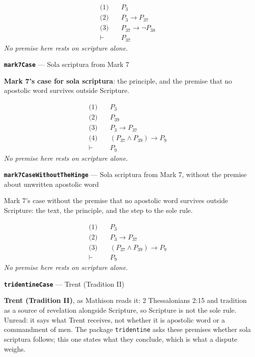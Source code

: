 \documentclass[11pt]{article}
\begin{document}
\begin{align*}
  \text{(1)} \quad & P_{3} \\
  \text{(2)} \quad & P_{3} \rightarrow P_{37} \\
  \text{(3)} \quad & P_{37} \rightarrow \lnot P_{38} \\
  \vdash \quad & P_{37}
\end{align*}
\emph{No premise here rests on scripture alone.}
\par\medskip\noindent\textbf{\texttt{mark7\allowbreak{}Case}} --- Sola scriptura from Mark 7\par\nobreak\noindent
\textbf{Mark 7's case for sola scriptura}: the principle, and the premise that no apostolic word survives outside Scripture.

\begin{align*}
  \text{(1)} \quad & P_{3} \\
  \text{(2)} \quad & P_{39} \\
  \text{(3)} \quad & P_{3} \rightarrow P_{37} \\
  \text{(4)} \quad & (P_{37} \land P_{39}) \rightarrow P_{9} \\
  \vdash \quad & P_{9}
\end{align*}
\emph{No premise here rests on scripture alone.}
\par\medskip\noindent\textbf{\texttt{mark7\allowbreak{}Case\allowbreak{}Without\allowbreak{}The\allowbreak{}Hinge}} --- Sola scriptura from Mark 7, without the premise about unwritten apostolic word\par\nobreak\noindent
Mark 7's case without the premise that no apostolic word survives outside Scripture: the text, the principle, and the step to the sole rule.

\begin{align*}
  \text{(1)} \quad & P_{3} \\
  \text{(2)} \quad & P_{3} \rightarrow P_{37} \\
  \text{(3)} \quad & (P_{37} \land P_{39}) \rightarrow P_{9} \\
  \vdash \quad & P_{9}
\end{align*}
\emph{No premise here rests on scripture alone.}
\par\medskip\noindent\textbf{\texttt{tridentine\allowbreak{}Case}} --- Trent (Tradition II)\par\nobreak\noindent
\textbf{Trent (Tradition II)}, as Mathison reads it: 2 Thessalonians 2:15 and tradition as a source of revelation alongside Scripture, so Scripture is not the sole rule. Unread: it says what Trent receives, not whether it is apostolic word or a commandment of men. The package \texttt{tridentine} asks these premises whether sola scriptura follows; this one states what they conclude, which is what a dispute weighs.
\end{document}
